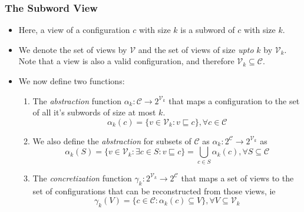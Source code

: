 \documentclass{beamer}
\begin{document}
{        \begin{frame}
            \frametitle{The Subword View}
            \begin{itemize}
                \item Here, a view of a configuration $c$ with size $k$ is a subword of $c$ with size $k$.
                \item We denote the set of views by $\mathcal{V}$ and the set of views of size \textit{upto} $k$ by $\mathcal{V}_{k}$. Note that a view is also a valid configuration, and therefore $\mathcal{V}_{k} \subseteq \mathcal{C}$.
                \item We now define two functions:
                \begin{enumerate}
                    \item The \textit{abstraction} function $\alpha_{k}: \mathcal{C} \rightarrow 2^{\mathcal{V}_{k}}$ that maps a configuration to the set of all it's subwords of size at most $k$.
                    \begin{equation*}
                        \alpha_{k}(c) = \{v \in \mathcal{V}_{k}: v \sqsubseteq c\}, \forall c \in \mathcal{C}
                    \end{equation*}
                    \item We also define the \textit{abstraction} for subsets of $\mathcal{C}$ as $\alpha_{k}: 2^{\mathcal{C}} \rightarrow 2^{\mathcal{V}_{k}}$ as
                    \begin{equation*}
                        \alpha_{k}(S) = \{v \in \mathcal{V}_{k}: \exists c \in S: v \sqsubseteq c\} = \bigcup\limits_{c \in S} \alpha_{k}(c), \forall S \subseteq \mathcal{C}
                    \end{equation*}
                    \item The \textit{concretization} function $\gamma_{k}: 2^{\mathcal{V}_{k}} \rightarrow 2^\mathcal{C}$ that maps a set of views to the set of configurations that can be reconstructed from those views, ie
                    \begin{equation*}
                        \gamma_{k}(V) = \{c \in \mathcal{C}: \alpha_{k}(c) \subseteq V\}, \forall V \subseteq \mathcal{V}_{k}
                    \end{equation*}
                \end{enumerate}
            \end{itemize}
        \end{frame}

}
\end{document}
